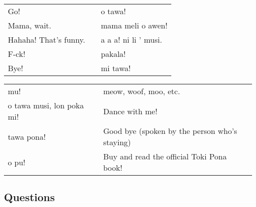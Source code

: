 \begin{supertabular}{p{5,5cm}|ll}
    Go!                   &  & o tawa!              \\
    Mama, wait.           &  & mama meli o awen!    \\
    Hahaha! That's funny. &  & a a a! ni li ' musi. \\
    F-ck!                 &  & pakala!              \\
    Bye!                  &  & mi tawa!             \\
\end{supertabular}

\begin{supertabular}{p{5,5cm}|ll}
    mu!                       &  & meow, woof, moo, etc.                         \\
    o tawa musi, lon poka mi! &  & Dance with me!                                \\
    tawa pona!                &  & Good bye (spoken by the person who's staying) \\
    o pu!                     &  & Buy and read the official Toki Pona book!     \\
\end{supertabular}

\newpage

\subsection*{Questions}
\label{'questions_using_seme'}


